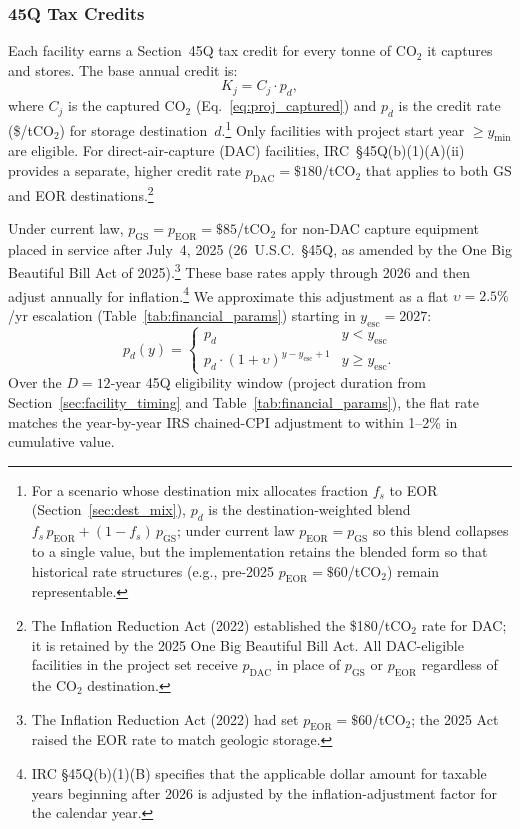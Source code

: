 \documentclass[11pt]{article}
\newcommand{\cotwo}{\ensuremath{\mathrm{CO_2}}}
\begin{document}
\subsubsection{45Q Tax Credits}
\label{sec:45q}

Each facility earns a Section~45Q tax credit for every tonne of \cotwo{} it captures and stores. The base annual credit is:
%
\begin{equation}
  K_j = C_j \cdot p_d,
  \label{eq:45q}
\end{equation}
%
where $C_j$ is the captured \cotwo{} (Eq.~\ref{eq:proj_captured}) and $p_d$ is the credit rate (\$/t\cotwo{}) for storage destination~$d$.\footnote{For a scenario whose destination mix allocates fraction $f_s$ to EOR (Section~\ref{sec:dest_mix}), $p_d$ is the destination-weighted blend $f_s\,p_{\text{EOR}} + (1-f_s)\,p_{\text{GS}}$; under current law $p_{\text{EOR}} = p_{\text{GS}}$ so this blend collapses to a single value, but the implementation retains the blended form so that historical rate structures (e.g., pre-2025 $p_{\text{EOR}} = \$60$/t\cotwo{}) remain representable.} Only facilities with project start year $\geq y_{\min}$ are eligible. For direct-air-capture (DAC) facilities, IRC~\S45Q(b)(1)(A)(ii) provides a separate, higher credit rate $p_{\text{DAC}} = \$180$/t\cotwo{} that applies to both GS and EOR destinations.\footnote{The Inflation Reduction Act (2022) established the \$180/t\cotwo{} rate for DAC; it is retained by the 2025 One Big Beautiful Bill Act. All DAC-eligible facilities in the project set receive $p_{\text{DAC}}$ in place of $p_{\text{GS}}$ or $p_{\text{EOR}}$ regardless of the \cotwo{} destination.}

Under current law, $p_{\text{GS}} = p_{\text{EOR}} = \$85$/t\cotwo{} for non-DAC capture equipment placed in service after July~4, 2025 (26~U.S.C.\ \S45Q, as amended by the One Big Beautiful Bill Act of 2025).\footnote{The Inflation Reduction Act (2022) had set $p_{\text{EOR}} = \$60$/t\cotwo{}; the 2025 Act raised the EOR rate to match geologic storage.} These base rates apply through 2026 and then adjust annually for inflation.\footnote{IRC \S45Q(b)(1)(B) specifies that the applicable dollar amount for taxable years beginning after 2026 is adjusted by the inflation-adjustment factor for the calendar year.} We approximate this adjustment as a flat $\upsilon = 2.5\%$/yr escalation (Table~\ref{tab:financial_params}) starting in $y_{\text{esc}} = 2027$:
%
\begin{equation}
  p_d(y) = \begin{cases}
    p_d & y < y_{\text{esc}} \\
    p_d \cdot (1 + \upsilon)^{y - y_{\text{esc}} + 1} & y \geq y_{\text{esc}}.
  \end{cases}
  \label{eq:45q_escalation}
\end{equation}
%
Over the $D = 12$-year 45Q eligibility window (project duration from Section~\ref{sec:facility_timing} and Table~\ref{tab:financial_params}), the flat rate matches the year-by-year IRS chained-CPI adjustment to within 1--2\% in cumulative value.
\end{document}
